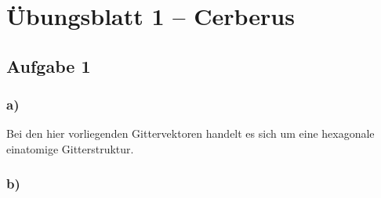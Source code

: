 \documentclass{scrartcl}
\begin{document}
\section*{Übungsblatt 1 -- Cerberus}

    \subsection*{Aufgabe 1}

        \subsubsection*{a)}

            Bei den hier vorliegenden Gittervektoren handelt es sich um eine hexagonale einatomige Gitterstruktur.

        \subsubsection*{b)}
\end{document}

